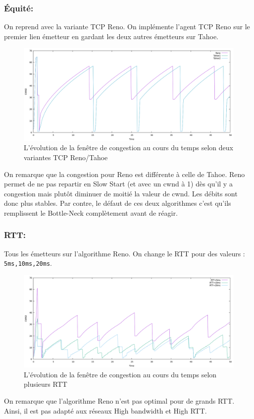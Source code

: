 \documentclass[a4paper,12pt]{article}
\begin{document}
\subsubsection{Équité:}
On reprend avec la variante TCP Reno. On implémente l'agent TCP Reno sur le premier lien émetteur en gardant les deux autres émetteurs sur Tahoe.
\begin{figure}[H]
\centering
\includegraphics[width=16cm]{img/tahoevsreno.png}
\caption{L'évolution de la fenêtre de congestion au cours du temps selon  deux variantes TCP Reno/Tahoe}
\end{figure}
On remarque que la congestion pour Reno est différente à celle de Tahoe. Reno permet de ne pas repartir en Slow Start (et avec un cwnd à 1) dès qu'il y a congestion mais plutôt diminuer de moitié la valeur de cwnd. Les débits sont donc plus stables. Par contre, le défaut de ces deux algorithmes c'est qu'ils remplissent le Bottle-Neck complètement avant de réagir.
\subsubsection{RTT:}
Tous les émetteurs sur l'algorithme Reno. On change le RTT pour des valeurs : \texttt{5ms,10ms,20ms}.
\begin{figure}[H]
\centering
\includegraphics[width=16cm]{img/RTT_Reno.png}
\caption{L'évolution de la fenêtre de congestion au cours du temps selon plusieurs RTT}
\end{figure}
On remarque que l'algorithme Reno n'est pas optimal pour de grands RTT. Ainsi, il est pas adapté aux réseaux High bandwidth et High RTT.
\end{document}
